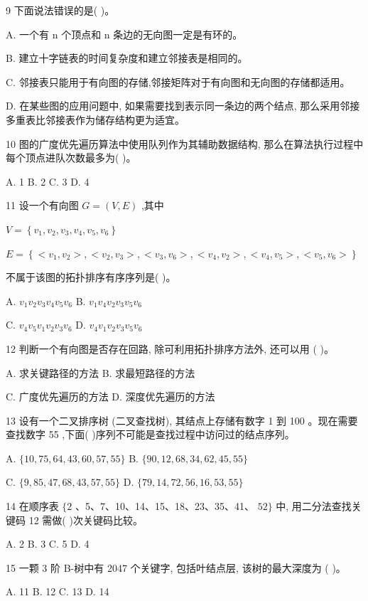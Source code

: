 9 下面说法错误的是(   )。

A. 一个有 n 个顶点和 n 条边的无向图一定是有环的。

B. 建立十字链表的时间复杂度和建立邻接表是相同的。

C. 邻接表只能用于有向图的存储,邻接矩阵对于有向图和无向图的存储都适用。

D. 在某些图的应用问题中, 如果需要找到表示同一条边的两个结点, 那么采用邻接多重表比邻接表作为储存结构更为适宜。

10 图的广度优先遍历算法中使用队列作为其辅助数据结构, 那么在算法执行过程中每个顶点进队次数最多为(   )。

A. 1 B. 2 C. 3 D. 4

11 设一个有向图 \(G = \left( {V,E}\right)\) ,其中

\(V = \left\{  {{v}_{1},{v}_{2},{v}_{3},{v}_{4},{v}_{5},{v}_{6}}\right\}\)

\(E = \left\{  { < {v}_{1},{v}_{2} > , < {v}_{2},{v}_{3} > , < {v}_{3},{v}_{6} > , < {v}_{4},{v}_{2} > , < {v}_{4},{v}_{5} > , < {v}_{5},{v}_{6} > }\right\}\)

不属于该图的拓扑排序有序序列是(   )。

A. \({v}_{1}{v}_{2}{v}_{3}{v}_{4}{v}_{5}{v}_{6}\) B. \({v}_{1}{v}_{4}{v}_{2}{v}_{3}{v}_{5}{v}_{6}\)

C. \({v}_{4}{v}_{5}{v}_{1}{v}_{2}{v}_{3}{v}_{6}\) D. \({v}_{4}{v}_{1}{v}_{2}{v}_{3}{v}_{5}{v}_{6}\)

12 判断一个有向图是否存在回路, 除可利用拓扑排序方法外, 还可以用 (   )。

A. 求关键路径的方法 B. 求最短路径的方法

C. 广度优先遍历的方法 D. 深度优先遍历的方法

13 设有一个二叉排序树 (二叉查找树), 其结点上存储有数字 1 到 100 。现在需要查找数字 55 ,下面(   )序列不可能是查找过程中访问过的结点序列。

A. \(\{ {10},{75},{64},{43},{60},{57},{55}\}\) B. \(\{ {90},{12},{68},{34},{62},{45},{55}\}\)

C. \(\{ 9,{85},{47},{68},{43},{57},{55}\}\) D. \(\{ {79},{14},{72},{56},{16},{53},{55}\}\)

14 在顺序表 \(\{ 2\) 、5、7、10、14、15、18、23、35、41、 \({52}\}\) 中, 用二分法查找关键码 12 需做(   )次关键码比较。

A. 2 B. 3 C. 5 D. 4

15 一颗 3 阶 B-树中有 2047 个关键字, 包括叶结点层, 该树的最大深度为 (   )。

A. 11 B. 12 C. 13 D. 14

